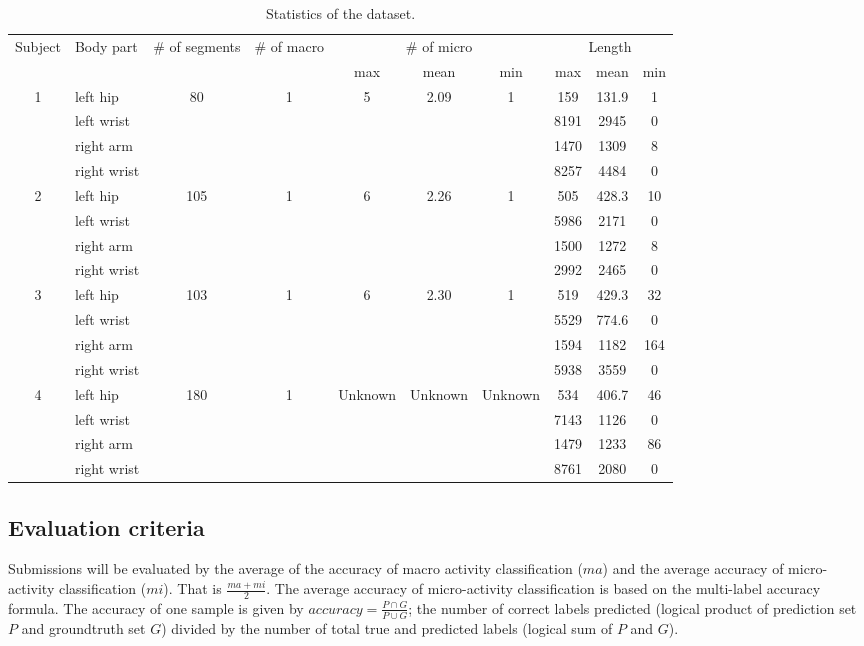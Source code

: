 \documentclass{svmult}
\begin{document}
\begin{table}[h]
    \centering
    \caption{Statistics of the dataset.}
    \begin{tabular}{c|l|c|c|c|c|c|c|c|c}\hline\hline
        Subject &Body part& \# of segments &\# of macro& \multicolumn{3}{c|}{\# of micro}& \multicolumn{3}{c}{Length}  \\
         &&&&max&mean&min&max&mean&min\\\hline
        \multirow{4}{*}{1} & left hip& \multirow{4}{*}{80} &\multirow{4}{*}{1}&\multirow{4}{*}{5}&\multirow{4}{*}{2.09}&\multirow{4}{*}{1}  &159&131.9&1 \\
          & left wrist&&&&&&8191&2945&0\\
          & right arm&&&&&&1470&1309&8\\
          & right wrist&&&&&&8257&4484&0\\\hline
        \multirow{4}{*}{2}& left hip& \multirow{4}{*}{105}&\multirow{4}{*}{1}&\multirow{4}{*}{6}&\multirow{4}{*}{2.26}&\multirow{4}{*}{1}&505&428.3&10   \\
          & left wrist&&&&&&5986&2171&0\\
          & right arm&&&&&&1500&1272&8\\
          & right wrist&&&&&&2992&2465&0\\\hline
        \multirow{4}{*}{3} & left hip& \multirow{4}{*}{103}&\multirow{4}{*}{1}&\multirow{4}{*}{6}&\multirow{4}{*}{2.30}&\multirow{4}{*}{1}&519&429.3&32  \\
          & left wrist&&&&&&5529&774.6&0\\
          & right arm&&&&&&1594&1182&164\\
          & right wrist&&&&&&5938&3559&0\\\hline
        \multirow{4}{*}{4} & left hip & \multirow{4}{*}{180}&\multirow{4}{*}{1}&\multirow{4}{*}{Unknown}&\multirow{4}{*}{Unknown}&\multirow{4}{*}{Unknown}&534&406.7&46 \\
          & left wrist&&&&&&7143&1126&0\\
          & right arm&&&&&&1479&1233&86\\
          & right wrist&&&&&&8761&2080&0\\\hline
    \end{tabular}
    \label{tab:stats}
\end{table}

\subsection{Evaluation criteria}
Submissions will be evaluated by the average of the accuracy of macro activity classification ($ma$) and the average accuracy of micro-activity classification ($mi$). That is $\frac{ma+mi}{2}$.
The average accuracy of micro-activity classification is based on the multi-label accuracy formula. The accuracy of one sample is given by $accuracy = \frac{P\cap G}{P\cup G}$; the number of correct labels predicted (logical product of prediction set $P$ and groundtruth set $G$) divided by the number of total true and predicted labels (logical sum of $P$ and $G$).
\end{document}
